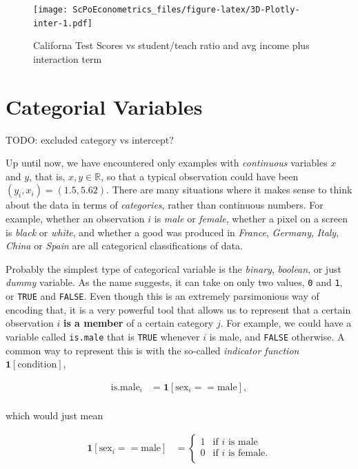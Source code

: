 \documentclass[]{book}
\theoremstyle{definition}
\theoremstyle{definition}
\theoremstyle{definition}
\theoremstyle{remark}
\begin{document}
\begin{figure}
\centering
\texttt{[image: ScPoEconometrics\_files/figure-latex/3D-Plotly-inter-1.pdf]}
\caption{\label{fig:3D-Plotly-inter}Californa Test Scores vs student/teach
ratio and avg income plus interaction term}
\end{figure}

\chapter{Categorial Variables}\label{categorical-vars}

TODO: excluded category vs intercept?

Up until now, we have encountered only examples with \emph{continuous}
variables \(x\) and \(y\), that is, \(x,y \in \mathbb{R}\), so that a
typical observation could have been \((y_i,x_i) = (1.5,5.62)\). There
are many situations where it makes sense to think about the data in
terms of \emph{categories}, rather than continuous numbers. For example,
whether an observation \(i\) is \emph{male} or \emph{female}, whether a
pixel on a screen is \emph{black} or \emph{white}, and whether a good
was produced in \emph{France}, \emph{Germany}, \emph{Italy},
\emph{China} or \emph{Spain} are all categorical classifications of
data.

Probably the simplest type of categorical variable is the \emph{binary},
\emph{boolean}, or just \emph{dummy} variable. As the name suggests, it
can take on only two values, \texttt{0} and \texttt{1}, or \texttt{TRUE}
and \texttt{FALSE}. Even though this is an extremely parsimonious way of
encoding that, it is a very powerful tool that allows us to represent
that a certain observation \(i\) \textbf{is a member} of a certain
category \(j\). For example, we could have a variable called
\texttt{is.male} that is \texttt{TRUE} whenever \(i\) is male, and
\texttt{FALSE} otherwise. A common way to represent this is with the
so-called \emph{indicator function} \(\mathbf{1}[\text{condition}]\),

\begin{align*}
\text{is.male}_i &= \mathbf{1}[\text{sex}_i==\text{male}], \\
\end{align*}

which would just mean

\begin{align*}
\mathbf{1}[\text{sex}_i==\text{male}] &= \begin{cases}
                    1 & \text{if }i\text{ is male} \\
                    0 & \text{if }i\text{ is female}. \\
                 \end{cases}
\end{align*}
\end{document}
